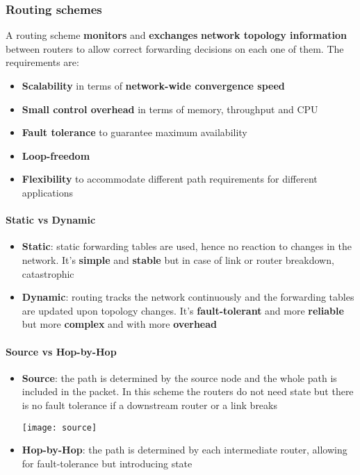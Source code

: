 \subsubsection{Routing schemes}
A routing scheme \textbf{monitors} and \textbf{exchanges} \textbf{network topology information} between routers to allow correct forwarding decisions on each one of them. The requirements are:
\begin{itemize}
	\item \textbf{Scalability} in terms of \textbf{network-wide convergence speed}
	\item \textbf{Small control overhead} in terms of memory, throughput and CPU
	\item \textbf{Fault tolerance} to guarantee maximum availability
	\item \textbf{Loop-freedom}
	\item \textbf{Flexibility} to accommodate different path requirements for different applications
\end{itemize}
\paragraph{Static vs Dynamic}
\begin{itemize}
	\item \textbf{Static}: static forwarding tables are used, hence no reaction to changes in the network. It's \textbf{simple} and \textbf{stable} but in case of link or router breakdown, catastrophic
	\item \textbf{Dynamic}: routing tracks the network continuously and the forwarding tables are updated upon topology changes. It's \textbf{fault-tolerant} and more \textbf{reliable} but more \textbf{complex} and with more \textbf{overhead}
\end{itemize}

\paragraph{Source vs Hop-by-Hop}
\begin{itemize}
	\item \textbf{Source}: the path is determined by the source node and the whole path is included in the packet. In this scheme the routers do not need state but there is no fault tolerance if a downstream router or a link breaks
	\begin{center}
		\texttt{[image: source]}
	\end{center}
	\item \textbf{Hop-by-Hop}: the path is determined by each intermediate router, allowing for fault-tolerance but introducing state
\end{itemize}


